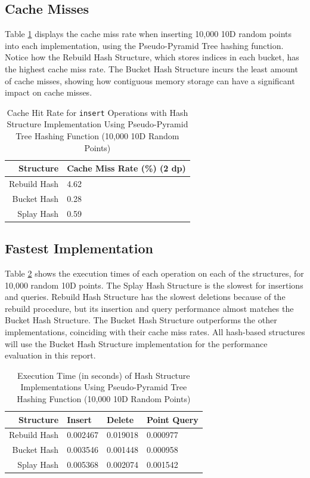\subsection{Cache Misses}

Table \ref{tab:perf1-cache-hit-rate} displays the cache miss rate when inserting 10,000 10D random points into each implementation, using the Pseudo-Pyramid Tree hashing function. Notice how the Rebuild Hash Structure, which stores indices in each bucket, has the highest cache miss rate. The Bucket Hash Structure incurs the least amount of cache misses, showing how contiguous memory storage can have a significant impact on cache misses.

\begin{table}
	\centering
	\begin{tabular}{|r|l|}
		\hline
		\textbf{Structure} & \textbf{Cache Miss Rate (\%) (2 dp)} \\
		\hline
		Rebuild Hash & 4.62 \\
		Bucket Hash & 0.28 \\
		Splay Hash & 0.59 \\
		\hline
	\end{tabular}
	\caption{Cache Hit Rate for \texttt{insert} Operations with Hash Structure Implementation Using Pseudo-Pyramid Tree Hashing Function (10,000 10D Random Points)}
	\label{tab:perf1-cache-hit-rate}
\end{table}

\subsection{Fastest Implementation}

Table \ref{tab:hash-implementation-speeds} shows the execution times of each operation on each of the structures, for 10,000 random 10D points. The Splay Hash Structure is the slowest for insertions and queries. Rebuild Hash Structure has the slowest deletions because of the rebuild procedure, but its insertion and query performance almost matches the Bucket Hash Structure. The Bucket Hash Structure outperforms the other implementations, coinciding with their cache miss rates. All hash-based structures will use the Bucket Hash Structure implementation for the performance evaluation in this report.

\begin{table}
	\centering
	\begin{tabular}{|r|l|l|l|}
	\hline
	\textbf{Structure} & \textbf{Insert} & \textbf{Delete} & \textbf{Point Query}  \\
	\hline
	Rebuild Hash & 0.002467 & 0.019018 & 0.000977 \\
	Bucket Hash & 0.003546 & 0.001448 & 0.000958 \\
	Splay Hash &  0.005368 & 0.002074 &  0.001542 \\
	\hline
	\end{tabular}
	\caption{Execution Time (in seconds) of Hash Structure Implementations Using Pseudo-Pyramid Tree Hashing Function (10,000 10D Random Points)}
	\label{tab:hash-implementation-speeds}
\end{table}

